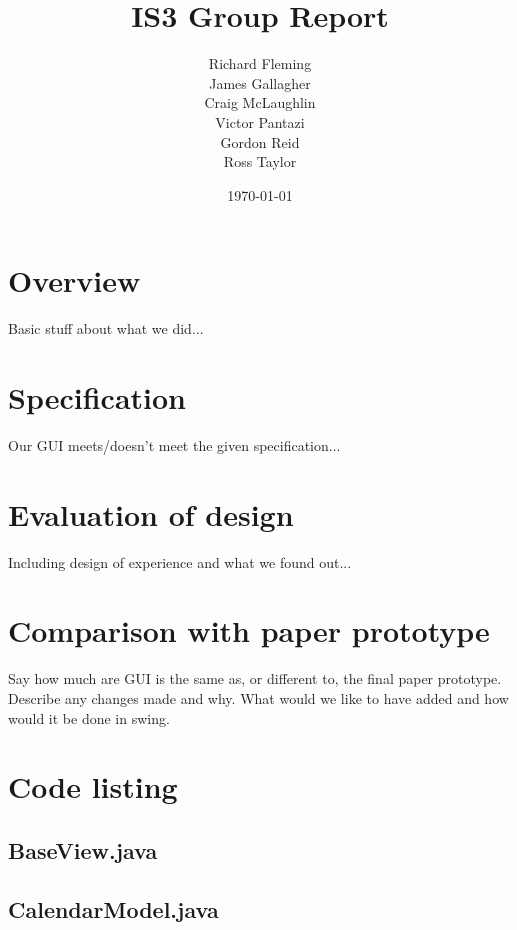 \documentclass{article}
\title{IS3 Group Report}
\author{
  Richard Fleming \\
  James Gallagher \\
  Craig McLaughlin \\
  Victor Pantazi \\
  Gordon Reid \\
  Ross Taylor}
\date{\today}
\begin{document}

\maketitle


\section{Overview}

Basic stuff about what we did...

\section{Specification}

Our GUI meets/doesn't meet the given specification...

\section{Evaluation of design}

Including design of experience and what we found out...

\section{Comparison with paper prototype}

Say how much are GUI is the same as, or different to, the final paper
prototype. Describe any changes made and why. What would we like to have
added and how would it be done in swing.

\appendix

\section{Code listing}

\subsection{BaseView.java}



\subsection{CalendarModel.java}
\end{document}
